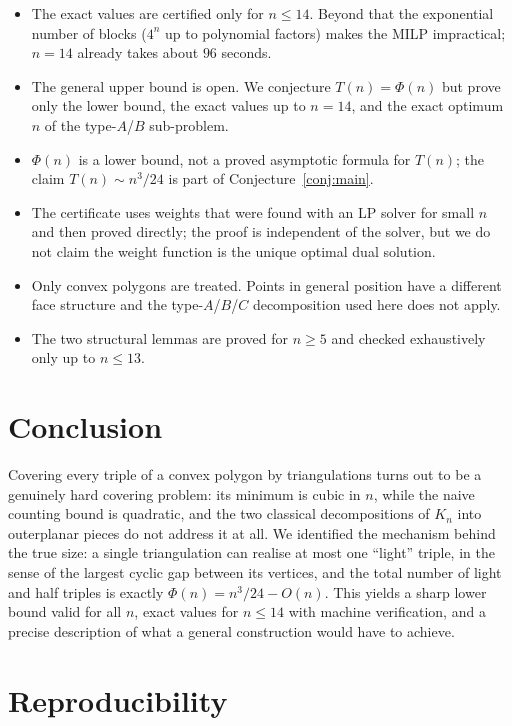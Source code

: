 \documentclass[11pt,a4paper]{article}
\theoremstyle{definition}
\begin{document}
\begin{itemize}[leftmargin=1.4em]
\item The exact values are certified only for $n \le 14$. Beyond that the
      exponential number of blocks ($4^{n}$ up to polynomial factors) makes the
      MILP impractical; $n = 14$ already takes about $96$ seconds.
\item The general upper bound is open. We conjecture $T(n) = \Phi(n)$ but prove
      only the lower bound, the exact values up to $n = 14$, and the exact
      optimum $n$ of the type-$A$/$B$ sub-problem.
\item $\Phi(n)$ is a lower bound, not a proved asymptotic formula for $T(n)$; the
      claim $T(n) \sim n^3/24$ is part of Conjecture~\ref{conj:main}.
\item The certificate uses weights that were found with an LP solver for small
      $n$ and then proved directly; the proof is independent of the solver, but
      we do not claim the weight function is the unique optimal dual solution.
\item Only convex polygons are treated. Points in general position have a
      different face structure and the type-$A$/$B$/$C$ decomposition used here
      does not apply.
\item The two structural lemmas are proved for $n \ge 5$ and checked
      exhaustively only up to $n \le 13$.
\end{itemize}

\section{Conclusion}\label{sec:conclusion}

Covering every triple of a convex polygon by triangulations turns out to be a
genuinely hard covering problem: its minimum is cubic in $n$, while the naive
counting bound is quadratic, and the two classical decompositions of $K_n$ into
outerplanar pieces do not address it at all. We identified the mechanism behind
the true size: a single triangulation can realise at most one ``light'' triple,
in the sense of the largest cyclic gap between its vertices, and the total number
of light and half triples is exactly $\Phi(n) = n^3/24 - O(n)$. This yields a
sharp lower bound valid for all $n$, exact values for $n \le 14$ with machine
verification, and a precise description of what a general construction would
have to achieve.

\section*{Reproducibility}
\end{document}
